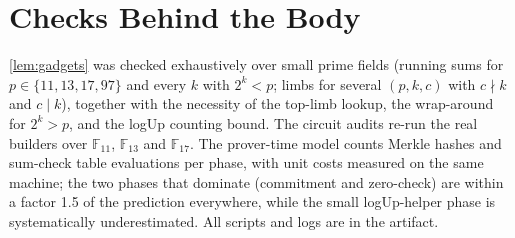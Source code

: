 \section{Checks Behind the Body}\label{app:checks}

\cref{lem:gadgets} was checked exhaustively over small prime fields (running sums for $p \in \{11, 13, 17, 97\}$
and every $k$ with $2^k < p$; limbs for several $(p, k, c)$ with $c \nmid k$ and $c \mid k$), together with the
necessity of the top-limb lookup, the wrap-around for $2^k > p$, and the logUp counting bound. The circuit audits
re-run the real builders over $\mathbb{F}_{11}$, $\mathbb{F}_{13}$ and $\mathbb{F}_{17}$. The prover-time model counts
Merkle hashes and sum-check table evaluations per phase, with unit costs measured on the same machine; the two
phases that dominate (commitment and zero-check) are within a factor 1.5 of the prediction everywhere, while the %
small logUp-helper phase is systematically underestimated. All scripts and logs are in the artifact.
